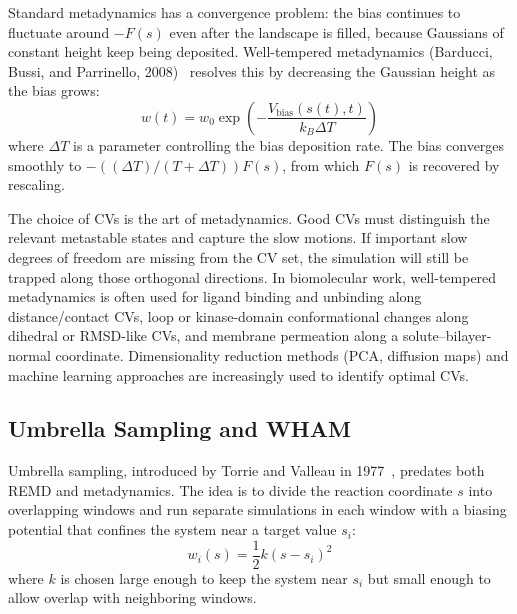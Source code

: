 Standard metadynamics has a convergence problem: the bias continues to fluctuate around $-F(s)$ even after the landscape is filled, because Gaussians of constant height keep being deposited. Well-tempered metadynamics (Barducci, Bussi, and Parrinello, 2008)~\cite{barducci2008} resolves this by decreasing the Gaussian height as the bias grows:
\begin{equation}
\label{eq:well-tempered}
w(t) = w_0 \exp\!\left(-\frac{V_{\text{bias}}(s(t), t)}{k_B \Delta T}\right)
\end{equation}
where $\Delta T$ is a parameter controlling the bias deposition rate. The bias converges smoothly to $-((\Delta T)/(T + \Delta T))F(s)$, from which $F(s)$ is recovered by rescaling.

The choice of CVs is the art of metadynamics. Good CVs must distinguish the relevant metastable states and capture the slow motions. If important slow degrees of freedom are missing from the CV set, the simulation will still be trapped along those orthogonal directions. In biomolecular work, well-tempered metadynamics is often used for ligand binding and unbinding along distance/contact CVs, loop or kinase-domain conformational changes along dihedral or RMSD-like CVs, and membrane permeation along a solute--bilayer-normal coordinate. Dimensionality reduction methods (PCA, diffusion maps) and machine learning approaches are increasingly used to identify optimal CVs.

\subsection{Umbrella Sampling and WHAM}
\label{sec:umbrella-sampling}

Umbrella sampling, introduced by Torrie and Valleau in 1977~\cite{torrie1977}, predates both REMD and metadynamics. The idea is to divide the reaction coordinate $s$ into overlapping windows and run separate simulations in each window with a biasing potential that confines the system near a target value $s_i$:
\begin{equation}
\label{eq:umbrella-bias}
w_i(s) = \frac{1}{2}k(s - s_i)^2
\end{equation}
where $k$ is chosen large enough to keep the system near $s_i$ but small enough to allow overlap with neighboring windows.

